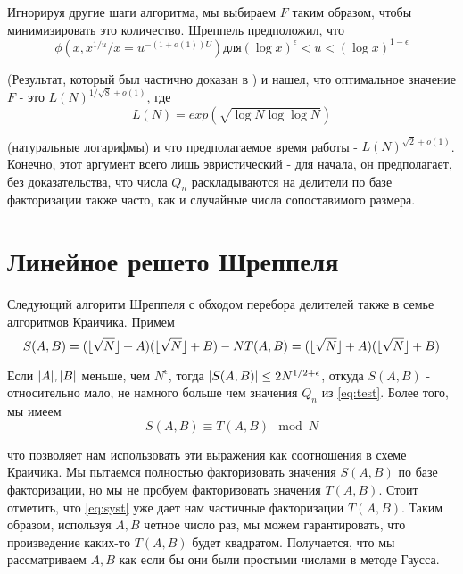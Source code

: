 \documentclass[a4paper,12pt]{report}
\DeclarePairedDelimiter\floor{\lfloor}{\rfloor}
\DeclarePairedDelimiter\abs{\lvert}{\rvert}%
\begin{document}
Игнорируя другие шаги алгоритма, мы выбираем $F$ таким образом, чтобы минимизировать это количество. Шреппель предположил, что
\begin{equation*}
\phi(x, x^{1/u}/x = u^{-(1+o(1))U}) для (\log{x})^{\epsilon} < u < (\log{x})^{1-\epsilon}
\end{equation*}

(Результат, который был частично доказан в \cite{facnum}) и нашел, что оптимальное значение $F$ - это $L(N)^{1/\sqrt{8} + o(1)}$, где 
\begin{equation*}
L(N) = exp(\sqrt{\log{N}\log{\log{N}}})
\end{equation*}

(натуральные логарифмы) и что предполагаемое время работы - $L(N)^{\sqrt{2} + o(1)}$. Конечно, этот аргумент всего лишь эвристический - для начала, он предполагает, без доказательства, что числа $Q_n$ раскладываются на делители по базе факторизации также часто, как и случайные числа сопоставимого размера.

\section{Линейное решето Шреппеля}
Следующий алгоритм Шреппеля с обходом перебора делителей также в семье алгоритмов Краичика. Примем
\begin{equation}\label{eq:syst}
S(A,B) = (\floor{\sqrt{N}} + A)(\floor{\sqrt{N}} + B) -N\\
T(A,B) = (\floor{\sqrt{N}} + A)(\floor{\sqrt{N}} + B)
\end{equation}

Если $\abs{A}, \abs{B}$ меньше, чем $N^{\epsilon}$, тогда $\abs{S(A,B)} \leq 2N^{1/2 + \epsilon}$, откуда $S(A,B)$ - относительно мало, не намного больше чем значения $Q_n$ из \eqref{eq:test}. Более того, мы имеем
\begin{equation*}
S(A,B) \equiv T(A,B) \mod N
\end{equation*}

что позволяет нам использовать эти выражения как соотношения в схеме Краичика. Мы пытаемся полностью факторизовать значения $S(A,B)$ по базе факторизации, но мы не пробуем факторизовать значения $T(A,B)$. Стоит отметить, что \eqref{eq:syst} уже дает нам частичные факторизации $T(A,B)$. Таким образом, используя $A, B$ четное число раз, мы можем гарантировать, что произведение каких-то $T(A,B)$ будет квадратом. Получается, что мы рассматриваем $A, B$ как если бы они были простыми числами в методе Гаусса.
\end{document}
